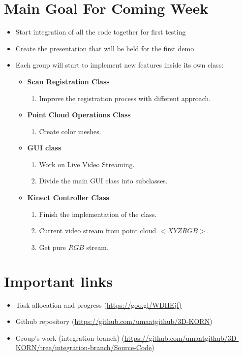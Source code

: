 \documentclass[11pt]{article} %
\begin{document}
\section{Main Goal For Coming Week}

\begin{itemize}

\item Start integration of all the code together for first testing

\item Create the presentation that will be held for the first demo


\item Each group will start to implement new features inside its own class:
\begin{itemize}
	
	\item \textbf{Scan Registration Class} 
	\begin{enumerate}
		\item Improve the registration process with different approach.
	\end{enumerate}
	
	
	\item \textbf{Point Cloud Operations Class}
\begin{enumerate}
	\item Create color meshes.
\end{enumerate}

	\item \textbf{GUI class}
	\begin{enumerate}
		\item Work on Live Video Streaming.
		\item Divide the main GUI class into subclasses.
	\end{enumerate}

	\item \textbf{Kinect Controller Class}
	\begin{enumerate}
		\item Finish the implementation of the class.
		\item Current video stream from point cloud $<XYZRGB>$.
		\item Get pure $RGB$ stream.
	\end{enumerate}
	
\end{itemize}




\end{itemize}

\section{Important links}
\begin{itemize}
\item Task allocation and progress  (\url{https://goo.gl/WDHEjf)}
\item Github repository (\url{https://github.com/umaatgithub/3D-KORN})
\item Group's work (integration branch) (\url{https://github.com/umaatgithub/3D-KORN/tree/integration-branch/Source-Code}) 


\end{itemize}
\end{document}
